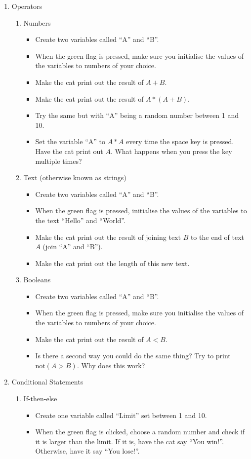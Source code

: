 \documentclass[12pt]{report}
\begin{document}
\begin{enumerate}
\item Operators
\begin{enumerate}
\item Numbers
\begin{itemize}
\item Create two variables called ``A'' and ``B''.
\item When the green flag is pressed, make sure you initialise the values of the variables to numbers of your choice.
\item Make the cat print out the result of $A+B$.
\item Make the cat print out the result of $A*(A+B)$.
\item Try the same but with ``A'' being a random number between 1 and 10.
\item Set the variable ``A'' to $A*A$ every time the space key is pressed. Have the cat print out $A$. What happens when you press the key multiple times?
\end{itemize}
\item Text (otherwise known as strings)
\begin{itemize}
\item Create two variables called ``A'' and ``B''.
\item When the green flag is pressed, initialise the values of the variables to the text ``Hello'' and ``World''.
\item Make the cat print out the result of joining text $B$ to the end of text $A$ (join ``A'' and ``B'').
\item Make the cat print out the length of this new text.
\end{itemize}
\item Booleans
\begin{itemize}
\item Create two variables called ``A'' and ``B''.
\item When the green flag is pressed, make sure you initialise the values of the variables to numbers of your choice.
\item Make the cat print out the result of $A<B$.
\item Is there a second way you could do the same thing? Try to print $\textrm{not}(A>B)$. Why does this work?
\end{itemize}
\end{enumerate}

\item Conditional Statements
\begin{enumerate}
\item If-then-else
\begin{itemize}
\item Create one variable called ``Limit'' set between 1 and 10.
\item When the green flag is clicked, choose a random number and check if it is larger than the limit. If it is, have the cat say ``You win!''. Otherwise, have it say ``You lose!''.
\end{itemize}
\end{enumerate}


\end{enumerate}
\end{document}
